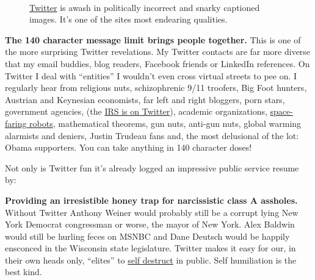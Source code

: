 \captionsetup[figure]{labelformat=empty}
\begin{figure}[htbp]
  \centering   
   \\
  \caption{\href{https://twitter.com/}{Twitter} is awash in politically incorrect and snarky captioned images. 
It's one of the sites most endearing qualities.}
  \label{jpg:twittertriv4375}
\end{figure}

\textbf{The 140 character message limit brings people together.} This is
one of the more surprising Twitter revelations. My Twitter contacts are
far more diverse that my email buddies, blog readers, Facebook friends
or LinkedIn references. On Twitter I deal with ``entities'' I wouldn't
even cross virtual streets to pee on. I regularly hear from religious
nuts, schizophrenic 9/11 troofers, Big Foot hunters, Austrian and
Keynesian economists, far left and right bloggers, porn stars,
government agencies, (the \href{https://twitter.com/IRSnews}{IRS is on
Twitter}), academic organizations,
\href{https://twitter.com/MarsCuriosity}{space-faring robots},
mathematical theorems, gun nuts, anti-gun nuts, global warming alarmists
and deniers, Justin Trudeau fans and, the most delusional of the lot:
Obama supporters. You can take anything in 140 character doses!

Not only is Twitter fun it's already logged an impressive public service
resume by:

\textbf{Providing an irresistible honey trap for narcissistic class A
assholes.} Without Twitter Anthony Weiner would probably still be a
corrupt lying New York Democrat congressman or worse, the mayor of New
York. Alex Baldwin would still be hurling feces on MSNBC and Dane
Deutsch would be happily ensconced in the Wisconsin state legislature.
Twitter makes it easy for our, in their own heads only, ``elites'' to
\href{http://content.time.com/time/specials/packages/article/0,28804,2075071\_2075082\_2075118,00.html}{self
destruct} in public. Self humiliation is the best kind.

